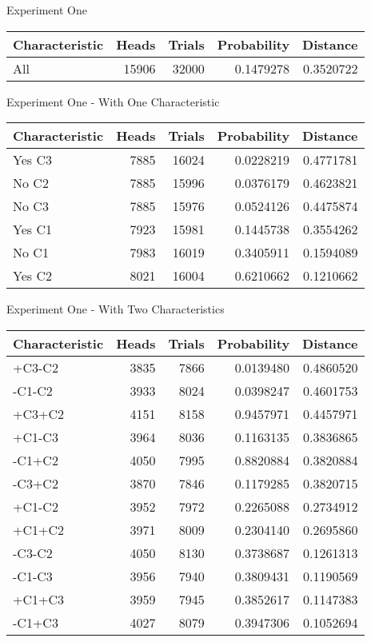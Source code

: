 \documentclass[
  ignorenonframetext,
]{beamer}
\renewcommand{\,}{\text{, }}
\begin{document}
\begin{frame}{Experiment One}
\protect\hypertarget{experiment-one}{}

\begin{longtable}[]{@{}lrrrr@{}}
\toprule
Characteristic & Heads & Trials & Probability & Distance\tabularnewline
\midrule
\endhead
All & 15906 & 32000 & 0.1479278 & 0.3520722\tabularnewline
\bottomrule
\end{longtable}

\end{frame}

\begin{frame}{Experiment One - With One Characteristic}
\protect\hypertarget{experiment-one---with-one-characteristic}{}

\begin{longtable}[]{@{}lrrrr@{}}
\toprule
Characteristic & Heads & Trials & Probability & Distance\tabularnewline
\midrule
\endhead
Yes C3 & 7885 & 16024 & 0.0228219 & 0.4771781\tabularnewline
No C2 & 7885 & 15996 & 0.0376179 & 0.4623821\tabularnewline
No C3 & 7885 & 15976 & 0.0524126 & 0.4475874\tabularnewline
Yes C1 & 7923 & 15981 & 0.1445738 & 0.3554262\tabularnewline
No C1 & 7983 & 16019 & 0.3405911 & 0.1594089\tabularnewline
Yes C2 & 8021 & 16004 & 0.6210662 & 0.1210662\tabularnewline
\bottomrule
\end{longtable}

\end{frame}

\begin{frame}{Experiment One - With Two Characteristics}
\protect\hypertarget{experiment-one---with-two-characteristics}{}

\begin{longtable}[]{@{}lrrrr@{}}
\toprule
Characteristic & Heads & Trials & Probability & Distance\tabularnewline
\midrule
\endhead
+C3-C2 & 3835 & 7866 & 0.0139480 & 0.4860520\tabularnewline
-C1-C2 & 3933 & 8024 & 0.0398247 & 0.4601753\tabularnewline
+C3+C2 & 4151 & 8158 & 0.9457971 & 0.4457971\tabularnewline
+C1-C3 & 3964 & 8036 & 0.1163135 & 0.3836865\tabularnewline
-C1+C2 & 4050 & 7995 & 0.8820884 & 0.3820884\tabularnewline
-C3+C2 & 3870 & 7846 & 0.1179285 & 0.3820715\tabularnewline
+C1-C2 & 3952 & 7972 & 0.2265088 & 0.2734912\tabularnewline
+C1+C2 & 3971 & 8009 & 0.2304140 & 0.2695860\tabularnewline
-C3-C2 & 4050 & 8130 & 0.3738687 & 0.1261313\tabularnewline
-C1-C3 & 3956 & 7940 & 0.3809431 & 0.1190569\tabularnewline
+C1+C3 & 3959 & 7945 & 0.3852617 & 0.1147383\tabularnewline
-C1+C3 & 4027 & 8079 & 0.3947306 & 0.1052694\tabularnewline
\bottomrule
\end{longtable}

\end{frame}
\end{document}
